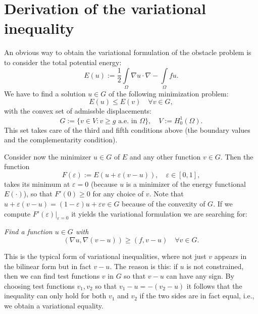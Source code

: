 \documentclass{article}
\begin{document}
\section{Derivation of the variational inequality}

An obvious way to obtain the variational formulation of the obstacle problem is to consider the total potential energy:
\begin{equation*}
 E(u):=\dfrac{1}{2}\int\limits_{\Omega} \nabla u \cdot \nabla - \int\limits_{\Omega} fu.
\end{equation*}
We have to find a solution $u\in G$ of the following minimization problem:
\begin{equation*}
 E(u)\leq E(v)\quad \forall v\in G,
\end{equation*}
with the convex set of admissble displacements:
\begin{equation*}
 G:=\lbrace v\in V: v\geq g \text{ a.e. in } \Omega\rbrace,\quad V:=H^1_0(\Omega).
\end{equation*}
This set takes care of the third and fifth conditions above (the boundary
values and the complementarity condition).

Consider now the minimizer $u\in G$ of $E$ and any other function $v\in
G$. Then the function
\begin{equation*}
 F(\varepsilon) := E(u+\varepsilon(v-u)),\quad\varepsilon\in\left[0,1\right],
\end{equation*}
takes its minimum at $\varepsilon = 0$ (because $u$ is a minimizer of the
energy functional $E(\cdot)$), so that $F'(0)\geq 0$ for any choice
of $v$. Note that
$u+\varepsilon(v-u) = (1-\varepsilon)u+\varepsilon v\in G$ because of the
convexity of $G$. If we compute $F'(\varepsilon)\vert_{\varepsilon=0}$ it
yields the variational formulation we are searching for:

\textit{Find a function $u\in G$ with}
\begin{equation*}
 \left(\nabla u, \nabla(v-u)\right) \geq \left(f,v-u\right) \quad \forall v\in G.
\end{equation*}

This is the typical form of variational inequalities, where not just $v$
appears in the bilinear form but in fact $v-u$. The reason is this: if $u$ is
not constrained, then we can find test functions $v$ in $G$ so that $v-u$ can have
any sign. By choosing test functions $v_1,v_2$ so that $v_1-u = -(v_2-u)$ it
follows that the inequality can only hold for both $v_1$ and $v_2$ if the two
sides are in fact equal, i.e., we obtain a variational equality.
\end{document}
